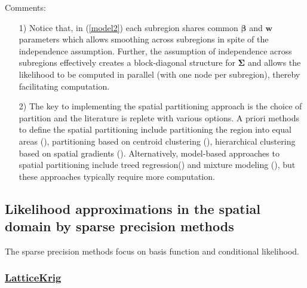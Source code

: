 \documentclass[
12pt, %
a4paper, %
oneside, %
headinclude,footinclude, %
BCOR5mm, %
]{scrartcl}
\begin{document}
\textcolor[rgb]{1.00,0.00,1.00}{Comments:}
\begin{itemize}
 \item [1)] Notice that, in (\ref{model2}) each subregion shares common $\boldsymbol{\beta}$ and $\boldsymbol{w}$ parameters which allows smoothing across subregions in spite of the independence assumption. Further, the assumption of independence across subregions effectively creates a block-diagonal structure for $\boldsymbol{\Sigma}$ and allows the likelihood to be computed in parallel (with one node per subregion), thereby facilitating computation.
 \item [2)] The key to implementing the spatial partitioning approach is the choice of partition and the literature is replete with various options. 
  A priori methods to define the spatial
partitioning include partitioning the region into equal areas (\href{https://chenyw68.github.io/Literature/[2011]Covariance approximation for large multivariate spatial data sets.pdf}{\citep{sang2011covariance}}), partitioning based on centroid clustering (\href{https://chenyw68.github.io/Literature/[2005]Analyzing nonstationary spatial data using piecewise Gaussian processes.pdf}{\citep{kim2005analyzing}}), hierarchical clustering based on spatial gradients (\href{https://chenyw68.github.io/Literature/[2017]Nonstationary Gaussian Process Models Using Spatial Hierarchical Clustering from Finite Differences.pdf}{\citep{heaton2017nonstationary}}). Alternatively, model-based approaches to spatial partitioning include treed regression(\href{https://chenyw68.github.io/Literature/[2014]Adaptive Bayesian Nonstationary Modeling for Large Spatial Datasets Using Covariance Approximations.pdf}{\citep{konomi2014adaptive}}) and mixture modeling (\href{https://chenyw68.github.io/Literature/[2014]A multivariate spatial mixture model for areal data.pdf}{\citet{neelon2014multivariate}}), but these approaches typically require more computation.
\end{itemize}


\subsection{Likelihood approximations in the spatial domain by sparse precision methods}
The sparse precision methods focus on basis function and conditional likelihood.
\subsubsection{\href{https://chenyw68.github.io/Literature/[2020]LatticeKrigVignette.pdf}{LatticeKrig}}
\href{https://chenyw68.github.io/Literature/[2015]A Multiresolution Gaussian Process Model for the Analysis of Large Spatial Datasets.pdf}{\citep{nychka2015multiresolution}}
\end{document}
